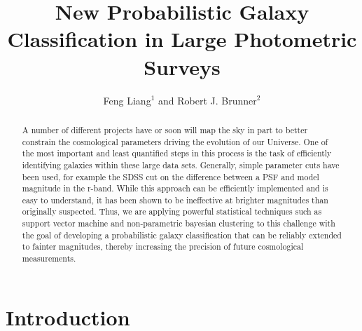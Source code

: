 
\resetcounters




\title{New Probabilistic Galaxy Classification in Large Photometric Surveys}
\author{Feng Liang$^1$ and Robert J. Brunner$^2$
}


\begin{abstract}
A number of different projects have or soon will map the sky in part to better constrain the cosmological parameters driving the evolution of our Universe. One of the most important and least quantified steps in this process is the task of efficiently identifying galaxies within these large data sets. Generally, simple parameter cuts have been used, for example the SDSS cut on the difference between a PSF and model magnitude in the r-band. While this approach can be efficiently implemented and is easy to understand, it has been shown to be ineffective at brighter magnitudes than originally suspected. Thus, we are applying powerful statistical techniques such as support vector machine and non-parametric bayesian clustering to this challenge with the goal of developing a probabilistic galaxy classification that can be reliably extended to fainter magnitudes, thereby increasing the precision of future cosmological measurements.
\end{abstract}

\section{Introduction}

